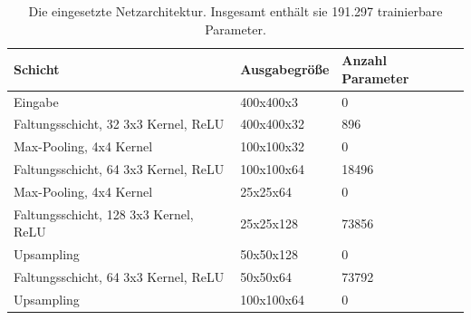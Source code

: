 \begin{table}
    \centering
    \caption{Die eingesetzte Netzarchitektur. Insgesamt enth\"alt sie
        191.297 trainierbare Parameter.}
    \label{tab:netzarchitektur}
    \begin{tabular}{|l|l|l|}
        \hline

        \textbf{Schicht}                       & \textbf{Ausgabegr\"o{\ss}e} & \textbf{Anzahl Parameter} \\

        \hline

        Eingabe                                & 400x400x3                   & 0                         \\

        \hline

        Faltungsschicht, 32 3x3 Kernel, ReLU   & 400x400x32                  & 896                       \\

        \hline

        Max-Pooling, 4x4 Kernel                & 100x100x32                  & 0                         \\

        \hline

        Faltungsschicht, 64 3x3 Kernel, ReLU   & 100x100x64                  & 18496                     \\

        \hline

        Max-Pooling, 4x4 Kernel                & 25x25x64                    & 0                         \\

        \hline

        Faltungsschicht, 128 3x3 Kernel, ReLU  & 25x25x128                   & 73856                     \\

        \hline

        Upsampling                             & 50x50x128                   & 0                         \\

        \hline

        Faltungsschicht, 64 3x3 Kernel, ReLU   & 50x50x64                    & 73792                     \\

        \hline

        Upsampling                             & 100x100x64                  & 0                         \\


\end{tabular}
\end{table}
